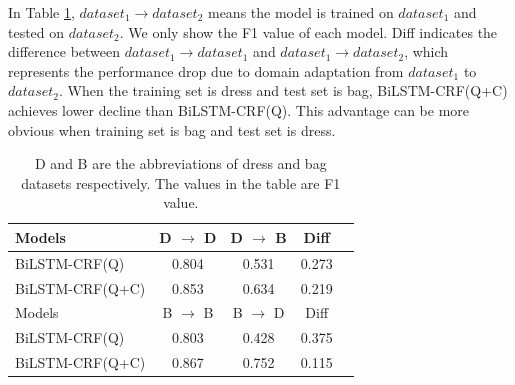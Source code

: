 In Table \ref{tab:domain}, $dataset_1 \rightarrow dataset_2$ means the model is trained on $dataset_1$ and tested on $dataset_2$. We only show the F1 value of each model. Diff indicates the difference between $dataset_1 \rightarrow dataset_1$ and $dataset_1 \rightarrow dataset_2$, which represents the performance drop due to domain adaptation from $dataset_1$ to $dataset_2$. When the training set is dress and test set is bag, BiLSTM-CRF(Q+C) achieves lower decline than BiLSTM-CRF(Q). This advantage can be more obvious when training set is bag and test set is dress.
\begin{table}[th]
	\centering
	\small
	\caption{D and B are the abbreviations of dress and bag datasets respectively. The values in the table are F1 value.}
	\begin{tabular}{lcccc}
		\toprule
		Models          & D $\rightarrow$ D & D $\rightarrow$ B & Diff  \\
		\midrule
		BiLSTM-CRF(Q)   & 0.804             & 0.531             & 0.273 \\
		BiLSTM-CRF(Q+C) & 0.853             & 0.634             & 0.219 \\
		\bottomrule
		\toprule
		Models          & B $\rightarrow$ B & B $\rightarrow$ D & Diff  \\
		\midrule
		BiLSTM-CRF(Q)   & 0.803             & 0.428             & 0.375 \\
		BiLSTM-CRF(Q+C) & 0.867             & 0.752             & 0.115 \\
		\bottomrule
	\end{tabular}
	\label{tab:domain}
\end{table}



